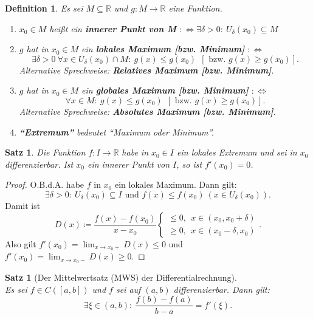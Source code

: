 \documentclass[12pt]{extreport} %
\newcommand{\R}{\mathbb{R}}
\theoremstyle{named}
\theoremstyle{itshape}
\newtheorem{satz}[unnamedtheorem]{Satz}
\newtheorem*{definition}{Definition}
\theoremstyle{normal}
\begin{document}
{\begin{definition}
	Es sei $M \subseteq \R$ und $g \colon M \rightarrow \R$ eine Funktion.
	\begin{enumerate}
		\item $x_{0} \in M$ hei{\ss}t ein \textbf{innerer Punkt von M} $:\iff \exists \delta > 0: ~ U_{\delta}(x_{0}) \subseteq M$
		\item $g$ hat in $x_{0} \in M$ ein \textbf{lokales Maximum [bzw. Minimum]} $:\iff$
		$$ 
		\exists \delta > 0 ~ \forall x \in U_{\delta}(x_{0}) \cap M: ~ g(x) \leq g(x_{0}) ~~ [\text{ bzw. } g(x) \geq g(x_{0})].
		$$
		Alternative Sprechweise: \textbf{Relatives Maximum [bzw. Minimum]}.
		\item $g$ hat in $x_{0} \in M$ ein \textbf{globales Maximum [bzw. Minimum]} $:\iff$
		$$ 
		\forall x \in M: ~ g(x) \leq g(x_{0}) ~~ [\text{ bzw. } g(x) \geq g(x_{0})].
		$$
		Alternative Sprechweise: \textbf{Absolutes Maximum [bzw. Minimum]}.
		\item \textbf{``Extremum''} bedeutet ``Maximum oder Minimum''.
	\end{enumerate}
	
	
\end{definition}


\begin{satz} \label{9.6:satz}
	Die Funktion $f \colon I \rightarrow \R$ habe in $x_{0} \in I$ ein lokales Extremum und sei in $x_{0}$ differenzierbar. Ist $x_{0}$ ein innerer Punkt von $I$, 
	so ist $f'(x_{0}) = 0$.
\end{satz}

\begin{proof}
	O.B.d.A. habe $f$ in $x_{0}$ ein lokales Maximum. Dann gilt: 
	$$ \exists \delta > 0: ~ U_{\delta}(x_{0}) \subseteq I \text{ und } f(x) \leq f(x_{0}) ~ (x \in U_{\delta}(x_{0})).$$
	Damit ist
	$$ D(x) \coloneqq \frac{f(x) - f(x_{0})}{x - x_{0}} \begin{cases} \leq 0, ~~ x \in (x_0,x_0+\delta) \\ \geq 0, ~~ x \in (x_0-\delta,x_0) \end{cases}. $$
	Also gilt $f'(x_{0}) = \lim_{x \rightarrow x_{0} +} D(x) \leq 0$ und $f'(x_{0}) = \lim_{x \rightarrow x_{0} -} D(x) \geq 0$. 
\end{proof}

\begin{satz}[Der Mittelwertsatz (MWS) der Differentialrechnung] \label{9.7:prop-Mittelwertsatz} ~\\
        Es sei $f \in C([a, b])$ und $f$ sei auf $(a, b)$ differenzierbar. Dann gilt: 
	$$ \exists \xi \in (a, b): ~ \frac{f(b) - f(a)}{b - a} = f'(\xi). $$		
\end{satz}

}
\end{document}
